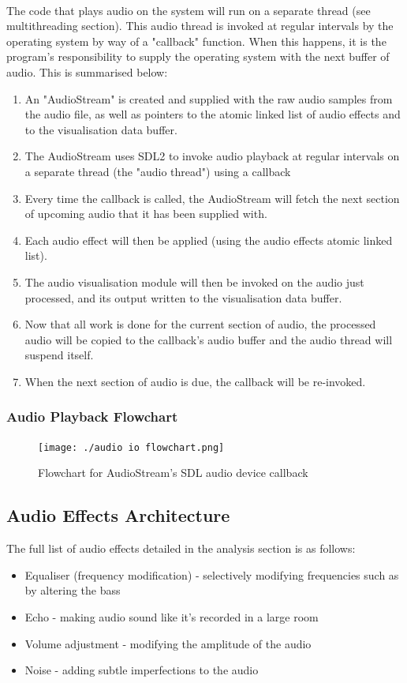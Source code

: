 \paragraph{}
The code that plays audio on the system will run on a separate thread (see multithreading section). This audio thread is invoked at regular intervals by the operating system by way of a "callback" function. When this happens, it is the program's responsibility to supply the operating system with the next buffer of audio. This is summarised below:

\begin{enumerate}
	\item An "AudioStream" is created and supplied with the raw audio samples from the audio file, as well as pointers to the atomic linked list of audio effects and to the visualisation data buffer.
	\item The AudioStream uses SDL2 to invoke audio playback at regular intervals on a separate thread (the "audio thread") using a callback
	\item Every time the callback is called, the AudioStream will fetch the next section of upcoming audio that it has been supplied with.
	\item Each audio effect will then be applied (using the audio effects atomic linked list).
	\item The audio visualisation module will then be invoked on the audio just processed, and its output written to the visualisation data buffer.
	\item Now that all work is done for the current section of audio, the processed audio will be copied to the callback's audio buffer and the audio thread will suspend itself.
	\item When the next section of audio is due, the callback will be re-invoked.
\end{enumerate}

\subsubsection { Audio Playback Flowchart }
\begin{figure}[H]
	\texttt{[image: ./audio io flowchart.png]}
	\caption{Flowchart for AudioStream's SDL audio device callback}
\end{figure}

\pagebreak

\subsection{Audio Effects Architecture}
The full list of audio effects detailed in the analysis section is as follows:
\begin{itemize}
	\item Equaliser (frequency modification) - selectively modifying frequencies such as by altering the bass
	\item Echo - making audio sound like it's recorded in a large room
	\item Volume adjustment - modifying the amplitude of the audio
	\item Noise - adding subtle imperfections to the audio
\end{itemize}

